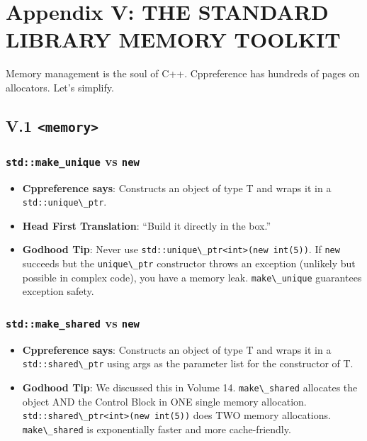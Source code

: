 \hypertarget{appendix-v-the-standard-library-memory-toolkit}{%
\section{Appendix V: THE STANDARD LIBRARY MEMORY
TOOLKIT}\label{appendix-v-the-standard-library-memory-toolkit}}

Memory management is the soul of C++. Cppreference has hundreds of pages
on allocators. Let's simplify.

\hypertarget{v.1-memory}{%
\subsection{\texorpdfstring{V.1
\texttt{\textless{}memory\textgreater{}}}{V.1 \textless memory\textgreater{}}}\label{v.1-memory}}

\hypertarget{stdmake_unique-vs-new}{%
\subsubsection{\texorpdfstring{\texttt{std::make\_unique} vs
\texttt{new}}{std::make\_unique vs new}}\label{stdmake_unique-vs-new}}

\begin{itemize}
\tightlist
\item
  \textbf{Cppreference says}: Constructs an object of type T and wraps
  it in a \passthrough{\lstinline!std::unique\_ptr!}.
\item
  \textbf{Head First Translation}: ``Build it directly in the box.''
\item
  \textbf{Godhood Tip}: Never use
  \passthrough{\lstinline!std::unique\_ptr<int>(new int(5))!}. If
  \passthrough{\lstinline!new!} succeeds but the
  \passthrough{\lstinline!unique\_ptr!} constructor throws an exception
  (unlikely but possible in complex code), you have a memory leak.
  \passthrough{\lstinline!make\_unique!} guarantees exception safety.
\end{itemize}

\hypertarget{stdmake_shared-vs-new}{%
\subsubsection{\texorpdfstring{\texttt{std::make\_shared} vs
\texttt{new}}{std::make\_shared vs new}}\label{stdmake_shared-vs-new}}

\begin{itemize}
\tightlist
\item
  \textbf{Cppreference says}: Constructs an object of type T and wraps
  it in a \passthrough{\lstinline!std::shared\_ptr!} using args as the
  parameter list for the constructor of T.
\item
  \textbf{Godhood Tip}: We discussed this in Volume 14.
  \passthrough{\lstinline!make\_shared!} allocates the object AND the
  Control Block in ONE single memory allocation.
  \passthrough{\lstinline!std::shared\_ptr<int>(new int(5))!} does TWO
  memory allocations. \passthrough{\lstinline!make\_shared!} is
  exponentially faster and more cache-friendly.
\end{itemize}

